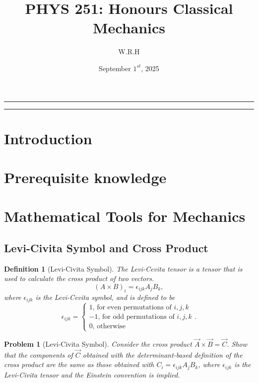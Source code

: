 \documentclass{article}
\newtheorem{definition}{Definition}
\newtheorem{problem}{Problem}
\begin{document}
\title{PHYS 251: Honours Classical Mechanics}
\author{W.R.H}
\date{September \(1^{st}\), 2025}
\setcounter{Maxaffil}{0}
\renewcommand\Affilfont{\itshape\small}
\maketitle

\noindent\rule{\textwidth}{0.4pt}
\thispagestyle{empty}
\begin{abstract}

\end{abstract}
\noindent\rule{\textwidth}{0.4pt}
\clearpage

\thispagestyle{empty}
{
  \hypersetup{linkcolor=black}
  \tableofcontents
}
\clearpage

\setcounter{page}{1}
\section{Introduction}
\section{Prerequisite knowledge}

\section{Mathematical Tools for Mechanics}
\subsection{Levi-Civita Symbol and Cross Product}
\begin{definition}[Levi-Civita Symbol]
    The Levi-Cevita tensor is a tensor that is used to calculate the cross product of two vectors.
    \[(A \times B)_i = \epsilon_{ijk} A_j B_k,\]
    where $\epsilon_{ijk}$ is the Levi-Cevita symbol, and is defined to be
    \[\epsilon_{ijk} = \begin{cases}1\text{, for even permutations of }i,j,k \\ -1\text{, for odd permutations of } i,j,k \\ 0\text{, otherwise}\end{cases}.\]
\end{definition}
\begin{problem}[Levi-Civita Symbol]
    Consider the cross product $\vec{A} \times \vec{B} = \vec{C}$. Show  that the components of $\vec{C}$ obtained with the determinant-based definition of the cross product are the same as those obtained with $C_i = \epsilon_{ijk} A_j B_k$, where $\epsilon_{ijk}$ is the Levi-Civita tensor and the Einstein convention is implied.
\end{problem}
\end{document}

